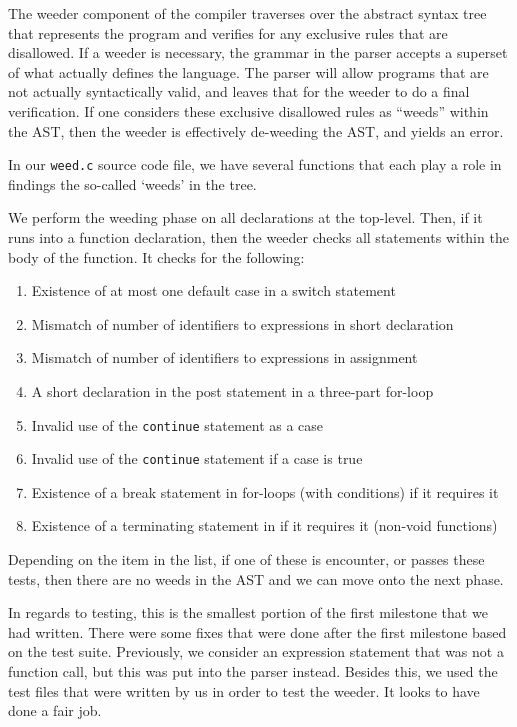 \documentclass{article}
\begin{document}
The weeder component of the compiler traverses over the abstract syntax tree that represents the program and verifies for any exclusive rules that are disallowed. If a weeder is necessary, the grammar in the parser accepts a superset of what actually defines the language. The parser will allow programs that are not actually syntactically valid, and leaves that for the weeder to do a final verification. If one considers these exclusive disallowed rules as ``weeds'' within the AST, then the weeder is effectively de-weeding the AST, and yields an error.

In our \texttt{weed.c} source code file, we have several functions that each play a role in findings the so-called `weeds' in the tree.

We perform the weeding phase on all declarations at the top-level. Then, if it runs into a function declaration, then the weeder checks all statements within the body of the function. It checks for the following:

\begin{enumerate}
    \item Existence of at most one default case in a switch statement
    \item Mismatch of number of identifiers to expressions in short declaration
    \item Mismatch of number of identifiers to expressions in assignment
    \item A short declaration in the post statement in a three-part for-loop
    \item Invalid use of the \texttt{continue} statement as a case
    \item Invalid use of the \texttt{continue} statement if a case is true
    \item Existence of a break statement in for-loops (with conditions) if it requires it
    \item Existence of a terminating statement in if it requires it (non-void functions)
\end{enumerate}

Depending on the item in the list, if one of these is encounter, or passes these tests, then there are no weeds in the AST and we can move onto the next phase.

In regards to testing, this is the smallest portion of the first milestone that we had written. There were some fixes that were done after the first milestone based on the test suite. Previously, we consider an expression statement that was not a function call, but this was put into the parser instead. Besides this, we used the test files that were written by us in order to test the weeder. It looks to have done a fair job.
\end{document}
